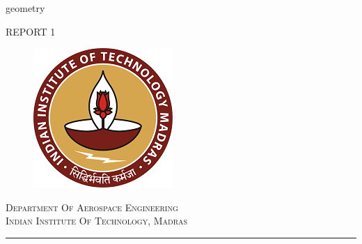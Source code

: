 

\usepackage{graphicx} 
\usepackage{float}

\usepackage[colorlinks,urlcolor=blue]{hyperref}
\usepackage{listings}
{geometry}
\usepackage{fancyhdr} 
\setlength{\parskip}{6pt}

\hypersetup{
    colorlinks,
    citecolor=black,
    filecolor=black,
    linkcolor=black,
    urlcolor=blue
} %
\pagestyle{fancy}




\begin{titlepage} %
	\newcommand{\HRule}{\rule{\linewidth}{0.5mm}} %
	
	\center %
	
	
	\textsc{\LARGE REPORT 1}\\[1 cm] %
	\begin{figure}[h!]
\centering
\includegraphics[scale=1]{IITM.png}
\label{fig:boat}
\end{figure} 

	 	\textsc{\large Department Of Aerospace Engineering}\\[0.5cm] %
	
	\textsc{\Large Indian Institute Of Technology, Madras}\\[0.5cm] %
	
		\HRule\\[0.4cm]
	

\end{titlepage}
